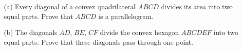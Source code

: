 (a) Every diagonal of a convex quadrilateral $ABCD$ divides its area into two equal parts. Prove that $ABCD$ is a parallelogram.

(b) The diagonals $AD$, $BE$, $CF$ divide the convex hexagon $ABCDEF$ into two equal parts. Prove that these diagonals pass through one point.
